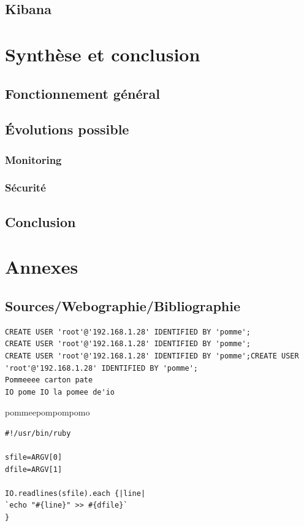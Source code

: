 \documentclass[a4paper,12pt,one side,titlepage]{report}
\begin{document}
\chapter{Kibana}
\lipsum


\part{Synthèse et conclusion}
\chapter{Fonctionnement général}

\chapter{Évolutions possible}
\section{Monitoring}
\section{Sécurité}

\chapter{Conclusion}

\part{Annexes}
\chapter{Sources/Webographie/Bibliographie}



\begin{lstlisting}[style=code]
CREATE USER 'root'@'192.168.1.28' IDENTIFIED BY 'pomme';
CREATE USER 'root'@'192.168.1.28' IDENTIFIED BY 'pomme';
CREATE USER 'root'@'192.168.1.28' IDENTIFIED BY 'pomme';CREATE USER 'root'@'192.168.1.28' IDENTIFIED BY 'pomme';
Pommeeee carton pate
IO pome IO la pomee de'io
\end{lstlisting}

pommeepompompomo

\begin{lstlisting}[style=code]
#!/usr/bin/ruby

sfile=ARGV[0]
dfile=ARGV[1]

IO.readlines(sfile).each {|line|
`echo "#{line}" >> #{dfile}`
}
\end{lstlisting}

\printglossaries
\end{document}
